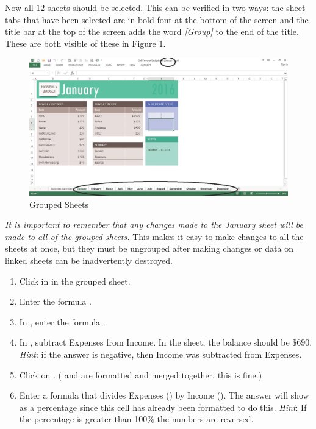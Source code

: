 Now all $ 12 $ sheets should be selected. This can be verified in two ways: the sheet tabs that have been selected are in bold font at the bottom of the screen and the title bar at the top of the screen adds the word \textit{[Group]} to the end of the title. These are both visible of these in Figure \ref{06:fig04}.

\begin{figure}[H]
	\centering
	\includegraphics[width=\maxwidth{.95\linewidth}]{gfx/ch06_fig04}
	\caption{Grouped Sheets}
	\label{06:fig04}
\end{figure}

\textit{It is important to remember that any changes made to the January sheet will be made to all of the grouped sheets.} This makes it easy to make changes to all the sheets at once, but they must be ungrouped after making changes or data on linked sheets can be inadvertently destroyed. 

\begin{enumerate}
	\item Click in  in the  grouped sheet.
	\item Enter the formula .
	\item In , enter the formula .
	\item In , subtract Expenses from Income. In the  sheet, the balance should be $ \$690 $. \textit{Hint}: if the answer is negative, then Income was subtracted from Expenses.
	\item Click on . ( and  are formatted and merged together, this is fine.)
	\item Enter a formula that divides Expenses () by Income (). The answer will show as a percentage since this cell has already been formatted to do this. \textit{Hint}: If the percentage is greater than 100\% the numbers are reversed.
\end{enumerate}

